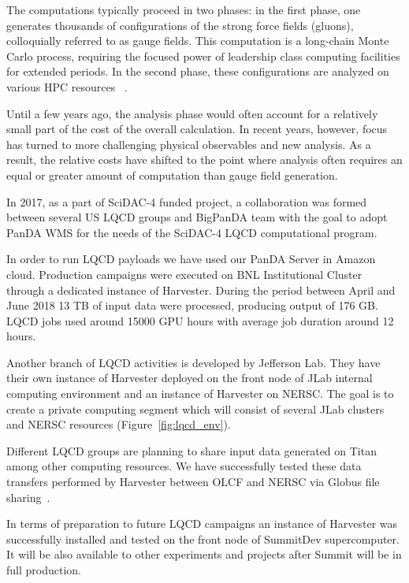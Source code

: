 \documentclass{webofc}
\begin{document}
The computations typically proceed in two phases: in the first phase, one generates thousands of configurations of the strong force fields (gluons), colloquially referred to as gauge fields. This computation is a long-chain Monte Carlo process, requiring the focused power of leadership class computing facilities for extended periods. In the second phase, these configurations are analyzed on various HPC resources ~\cite{Babich:2010:PQL:1884643.1884695}.

Until a few years ago, the analysis phase would often account for a relatively small part of the cost of the overall calculation. In recent years, however, focus has turned to more challenging physical observables and new analysis. As a result, the relative costs have shifted to the point where analysis often requires an equal or greater amount of computation than gauge field generation.

In 2017, as a part of SciDAC-4 funded project, a collaboration was formed between several US LQCD groups and BigPanDA team with the goal to adopt PanDA WMS for the needs of the SciDAC-4 LQCD computational program.

In order to run LQCD payloads we have used our PanDA Server in Amazon cloud. Production campaigns were executed on BNL Institutional Cluster through a dedicated instance of Harvester. During the period between April and June 2018 13 TB of input data were processed, producing output of 176 GB. LQCD jobs used around 15000 GPU hours with average job duration around 12 hours.

Another branch of LQCD activities is developed by Jefferson Lab. They have their own instance of Harvester deployed on the front node of JLab internal computing environment and an instance of Harvester on NERSC. The goal is to create a private computing segment which will consist of several JLab clusters and NERSC resources (Figure~\ref{fig:lqcd_env}).

Different LQCD groups are planning to share input data generated on Titan among other computing resources. We have successfully tested these data transfers performed by Harvester between OLCF and NERSC via Globus file sharing~\cite{Globusdatatransfer}.

In terms of preparation to future LQCD campaigns an instance of Harvester was successfully installed and tested on the front node of SummitDev supercomputer. It will be also available to other experiments and projects after Summit will be in full production.
\end{document}
